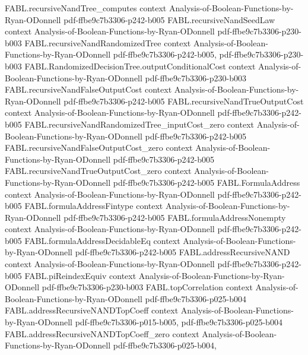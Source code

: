 \begin{theorem}
\proofstep
  {FABL.recursiveNandTree_computes}
  {context}
  {Analysis-of-Boolean-Functions-by-Ryan-ODonnell}
  {pdf-ffbe9c7b3306-p242-b005}
\proofstep
  {FABL.recursiveNandSeedLaw}
  {context}
  {Analysis-of-Boolean-Functions-by-Ryan-ODonnell}
  {pdf-ffbe9c7b3306-p230-b003}
\proofstep
  {FABL.recursiveNandRandomizedTree}
  {context}
  {Analysis-of-Boolean-Functions-by-Ryan-ODonnell}
  {pdf-ffbe9c7b3306-p242-b005,
    pdf-ffbe9c7b3306-p230-b003}
\proofstep
  {FABL.RandomizedDecisionTree.outputConditionalCost}
  {context}
  {Analysis-of-Boolean-Functions-by-Ryan-ODonnell}
  {pdf-ffbe9c7b3306-p230-b003}
\proofstep
  {FABL.recursiveNandFalseOutputCost}
  {context}
  {Analysis-of-Boolean-Functions-by-Ryan-ODonnell}
  {pdf-ffbe9c7b3306-p242-b005}
\proofstep
  {FABL.recursiveNandTrueOutputCost}
  {context}
  {Analysis-of-Boolean-Functions-by-Ryan-ODonnell}
  {pdf-ffbe9c7b3306-p242-b005}
\proofstep
  {FABL.recursiveNandRandomizedTree_inputCost_zero}
  {context}
  {Analysis-of-Boolean-Functions-by-Ryan-ODonnell}
  {pdf-ffbe9c7b3306-p242-b005}
\proofstep
  {FABL.recursiveNandFalseOutputCost_zero}
  {context}
  {Analysis-of-Boolean-Functions-by-Ryan-ODonnell}
  {pdf-ffbe9c7b3306-p242-b005}
\proofstep
  {FABL.recursiveNandTrueOutputCost_zero}
  {context}
  {Analysis-of-Boolean-Functions-by-Ryan-ODonnell}
  {pdf-ffbe9c7b3306-p242-b005}
\proofstep
  {FABL.FormulaAddress}
  {context}
  {Analysis-of-Boolean-Functions-by-Ryan-ODonnell}
  {pdf-ffbe9c7b3306-p242-b005}
\proofstep
  {FABL.formulaAddressFintype}
  {context}
  {Analysis-of-Boolean-Functions-by-Ryan-ODonnell}
  {pdf-ffbe9c7b3306-p242-b005}
\proofstep
  {FABL.formulaAddressNonempty}
  {context}
  {Analysis-of-Boolean-Functions-by-Ryan-ODonnell}
  {pdf-ffbe9c7b3306-p242-b005}
\proofstep
  {FABL.formulaAddressDecidableEq}
  {context}
  {Analysis-of-Boolean-Functions-by-Ryan-ODonnell}
  {pdf-ffbe9c7b3306-p242-b005}
\proofstep
  {FABL.addressRecursiveNAND}
  {context}
  {Analysis-of-Boolean-Functions-by-Ryan-ODonnell}
  {pdf-ffbe9c7b3306-p242-b005}
\proofstep
  {FABL.piReindexEquiv}
  {context}
  {Analysis-of-Boolean-Functions-by-Ryan-ODonnell}
  {pdf-ffbe9c7b3306-p230-b003}
\proofstep
  {FABL.topCorrelation}
  {context}
  {Analysis-of-Boolean-Functions-by-Ryan-ODonnell}
  {pdf-ffbe9c7b3306-p025-b004}
\proofstep
  {FABL.addressRecursiveNANDTopCoeff}
  {context}
  {Analysis-of-Boolean-Functions-by-Ryan-ODonnell}
  {pdf-ffbe9c7b3306-p015-b005,
    pdf-ffbe9c7b3306-p025-b004}
\proofstep
  {FABL.addressRecursiveNANDTopCoeff_zero}
  {context}
  {Analysis-of-Boolean-Functions-by-Ryan-ODonnell}
  {pdf-ffbe9c7b3306-p025-b004,
}
\end{theorem}
